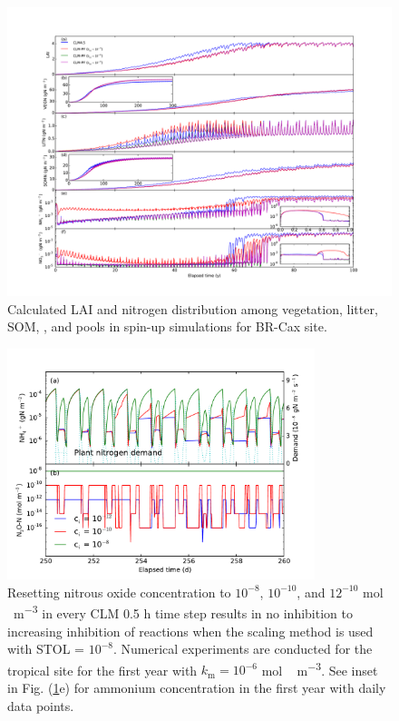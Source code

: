\documentclass[gmd, manuscript]{copernicus}
\begin{document}
\begin{figure}[t]
\includegraphics[width=18cm]{../figs/fig12/cax300yl.pdf}
\caption{Calculated LAI and nitrogen distribution among vegetation, litter,
SOM, , and  pools in spin-up simulations for BR-Cax
site. }
\label{fig:cax300yl}
\end{figure}


\begin{figure}[t]
\includegraphics[width=0.8\textwidth]{../figs/fig18/cax1yn2o.pdf}
\caption{Resetting nitrous oxide concentration to $10^{-8}$, $10^{-10}$, and $12^{-10}$ \unit{mol\,m^{-3}} in every CLM 0.5 h time step results in no inhibition to increasing inhibition of reactions when the scaling method is used with STOL = $10^{-8}$. Numerical experiments are conducted for the tropical site for the first year with $k_\text{m}=10^{-6}$ \unit{mol\,m^{-3}}. See inset in Fig. (\ref{fig:cax300yl}e) for ammonium concentration in the first year with daily data points.}
\label{fig:cax1yn2o}
\end{figure}
\end{document}
